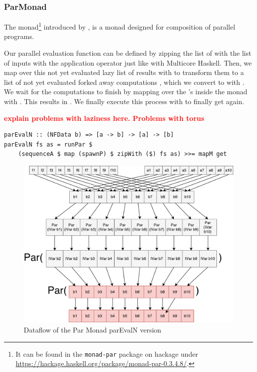 \subsubsection{ParMonad}
The  monad\footnote{It can be found in the \texttt{monad-par} package on hackage under \url{https://hackage.haskell.org/package/monad-par-0.3.4.8/}.} introduced by \citet{monad_par_paper_2011}, is a monad designed for composition of parallel programs.


Our parallel evaluation function  can be defined by zipping the list of \inlinecode{[a -> b]} with the list of inputs \inlinecode{[a]} with the application operator \inlinecode{\$} just like with Multicore Haskell. Then, we map over this not yet evaluated lazy list of results \inlinecode{[b]} with  to transform them to a list of not yet evaluated forked away computations , which we convert to  with . We wait for the computations to finish by mapping over the 's inside the  monad with . This results in . We finally execute this process with  to finally get \inlinecode{[b]} again.

\textbf{\textcolor{red}{explain problems with laziness here. Problems with torus}}

\begin{lstlisting}[frame=htrbl]
parEvalN :: (NFData b) => [a -> b] -> [a] -> [b]
parEvalN fs as = runPar $ 
	(sequenceA $ map (spawnP) $ zipWith ($) fs as) >>= mapM get
\end{lstlisting}
\begin{figure}[h]
	\includegraphics[scale=0.5]{images/parEvalNParMonad}
	\caption{Dataflow of the Par Monad parEvalN version}
\end{figure}

